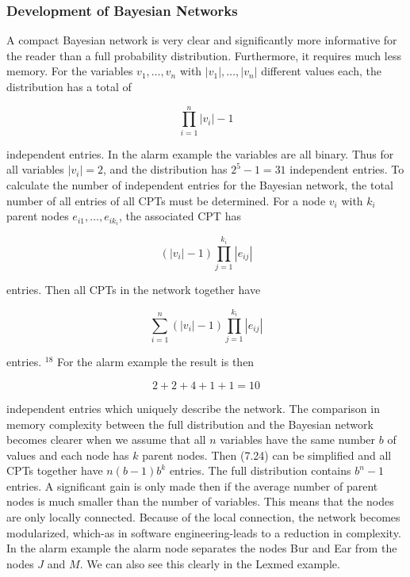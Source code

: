 \documentclass[10pt]{book}
\begin{document}
\subsubsection*{Development of Bayesian Networks}
A compact Bayesian network is very clear and significantly more informative for the reader than a full probability distribution. Furthermore, it requires much less memory. For the variables $v_{1}, \ldots, v_{n}$ with $\left|v_{1}\right|, \ldots,\left|v_{n}\right|$ different values each, the distribution has a total of

$$
\prod_{i=1}^{n}\left|v_{i}\right|-1
$$

independent entries. In the alarm example the variables are all binary. Thus for all variables $\left|v_{i}\right|=2$, and the distribution has $2^{5}-1=31$ independent entries. To calculate the number of independent entries for the Bayesian network, the total number of all entries of all CPTs must be determined. For a node $v_{i}$ with $k_{i}$ parent nodes $e_{i 1}, \ldots, e_{i k_{i}}$, the associated CPT has

$$
\left(\left|v_{i}\right|-1\right) \prod_{j=1}^{k_{i}}\left|e_{i j}\right|
$$

entries. Then all CPTs in the network together have


\begin{equation*}
\sum_{i=1}^{n}\left(\left|v_{i}\right|-1\right) \prod_{j=1}^{k_{i}}\left|e_{i j}\right| \tag{7.24}
\end{equation*}


entries. ${ }^{18}$ For the alarm example the result is then

$$
2+2+4+1+1=10
$$

independent entries which uniquely describe the network. The comparison in memory complexity between the full distribution and the Bayesian network becomes clearer when we assume that all $n$ variables have the same number $b$ of values and each node has $k$ parent nodes. Then (7.24) can be simplified and all CPTs together have $n(b-1) b^{k}$ entries. The full distribution contains $b^{n}-1$ entries. A significant gain is only made then if the average number of parent nodes is much smaller than the number of variables. This means that the nodes are only locally connected. Because of the local connection, the network becomes modularized, which-as in software engineering-leads to a reduction in complexity. In the alarm example the alarm node separates the nodes Bur and Ear from the nodes $J$ and $M$. We can also see this clearly in the Lexmed example.
\end{document}
